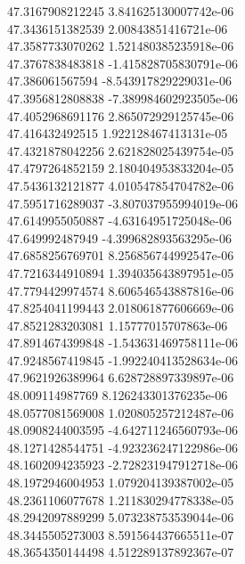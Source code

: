 {47.3167908212245 3.841625130007742e-06
 \\
47.3436151382539 2.00843851416721e-06
 \\
47.3587733070262 1.521480385235918e-06
 \\
47.3767838483818 -1.415828705830791e-06
 \\
47.386061567594 -8.543917829229031e-06
 \\
47.3956812808838 -7.389984602923505e-06
 \\
47.4052968691176 2.865072929125745e-06
 \\
47.416432492515 1.922128467413131e-05
 \\
47.4321878042256 2.621828025439754e-05
 \\
47.4797264852159 2.180404953833204e-05
 \\
47.5436132121877 4.010547854704782e-06
 \\
47.5951716289037 -3.807037955994019e-06
 \\
47.6149955050887 -4.63164951725048e-06
 \\
47.649992487949 -4.399682893563295e-06
 \\
47.6858256769701 8.256856744992547e-06
 \\
47.7216344910894 1.394035643897951e-05
 \\
47.7794429974574 8.606546543887816e-06
 \\
47.8254041199443 2.018061877606669e-06
 \\
47.8521283203081 1.15777015707863e-06
 \\
47.8914674399848 -1.543631469758111e-06
 \\
47.9248567419845 -1.992240413528634e-06
 \\
47.9621926389964 6.628728897339897e-06
 \\
48.009114987769 8.126243301376235e-06
 \\
48.0577081569008 1.020805257212487e-06
 \\
48.0908244003595 -4.642711246560793e-06
 \\
48.1271428544751 -4.923236247122986e-06
 \\
48.1602094235923 -2.728231947912718e-06
 \\
48.1972946004953 1.079204139387002e-05
 \\
48.2361106077678 1.211830294778338e-05
 \\
48.2942097889299 5.073238753539044e-06
 \\
48.3445505273003 8.591564437665511e-07
 \\
48.3654350144498 4.512289137892367e-07
}
